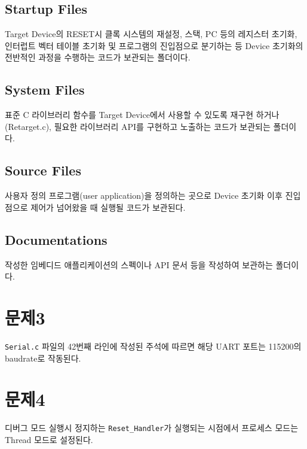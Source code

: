 \documentclass{article}
\begin{document}
\begin{mdframed}
\subsection*{Startup Files}
Target Device의 RESET시 클록 시스템의 재설정, 스택, PC 등의 레지스터 초기화, 인터럽트 벡터 테이블 초기화 및 
프로그램의 진입점으로 분기하는 등 Device 초기화의 전반적인 과정을 수행하는 코드가 보관되는 폴더이다.

\subsection*{System Files}
표준 C 라이브러리 함수를 Target Device에서 사용할 수 있도록 재구현 하거나(Retarget.c), 필요한 라이브러리 
API를 구현하고 노출하는 코드가 보관되는 폴더이다.

\subsection*{Source Files}
사용자 정의 프로그램(user application)을 정의하는 곳으로 Device 초기화 이후 진입점으로 제어가 넘어왔을 때 실행될 코드가 보관된다.

\subsection*{Documentations}
작성한 임베디드 애플리케이션의 스펙이나 API 문서 등을 작성하여 보관하는 폴더이다.
\end{mdframed}

\section*{문제3 \small{}}
\begin{mdframed}
\texttt{Serial.c} 파일의 42번째 라인에 작성된 주석에 따르면 해당 UART 포트는 115200의 baudrate로 작동된다.
\end{mdframed}

\section*{문제4 \small{}}
\begin{mdframed}
디버그 모드 실행시 정지하는 \texttt{Reset\_Handler}가 실행되는 시점에서 프로세스 모드는 Thread 모드로 설정된다.
\end{mdframed}
\end{document}

